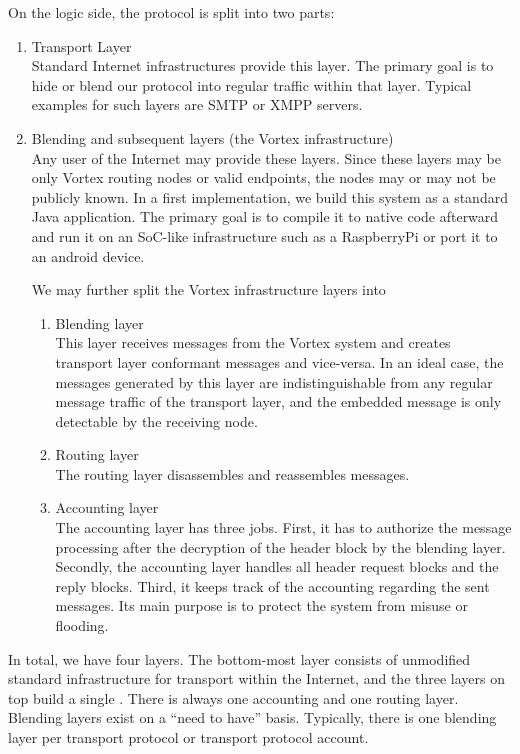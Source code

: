 On the logic side, the protocol is split into two parts:
\begin{enumerate}
	\item Transport Layer\\
	Standard Internet infrastructures provide this layer. The primary goal is to hide or blend our protocol into regular traffic within that layer. Typical examples for such layers are SMTP or XMPP servers.
	\item Blending and subsequent layers (the Vortex infrastructure)\\
	Any user of the Internet may provide these layers. Since these layers may be only Vortex routing nodes or valid endpoints, the nodes may or may not be publicly known. In a first implementation, we build this system as a standard Java application. The primary goal is to compile it to native code afterward and run it on an SoC-like infrastructure such as a RaspberryPi or port it to an android device.
	
	We may further split the Vortex infrastructure layers into
	\begin{enumerate}
		\item  Blending layer\\
		This layer receives messages from the Vortex system and creates transport layer conformant messages and vice-versa. In an ideal case, the messages generated by this layer are indistinguishable from any regular message traffic of the transport layer, and the embedded message is only detectable by the receiving node.
		\item Routing layer\\
		The routing layer disassembles and reassembles messages. 
		\item Accounting layer\\
		The accounting layer has three jobs. First, it has to authorize the message processing after the decryption of the header block by the blending layer. Secondly, the accounting layer handles all header request blocks and the reply blocks. Third, it keeps track of the accounting regarding the sent messages. Its main purpose is to protect the system from misuse or flooding.    
	\end{enumerate}
\end{enumerate}

In total, we have four layers. The bottom-most layer consists of unmodified standard infrastructure for transport within the Internet, and the three layers on top build a single \VortexNode. There is always one accounting and one routing layer. Blending layers exist on a ``need to have'' basis. Typically, there is one blending layer per transport protocol or transport protocol account.

